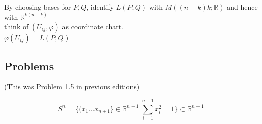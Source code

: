 By choosing bases for $P,Q$, identify $L(P;Q)$ with $M((n-k)k; \mathbb{R})$ and hence with $\mathbb{R}^{k(n-k)}$ \\

think of $(U_Q, \varphi)$ as coordinate chart. \\
$\varphi(U_Q) = L(P;Q)$













\subsection*{Problems}

 (This was Problem 1.5 in previous editions)

\[
S^n = \lbrace ( x_1 \dots x_{n+1} \rbrace \in \mathbb{R}^{n+1} | \sum_{i=1}^{n+1} x_i^2 = 1 \rbrace \subset \mathbb{R}^{n+1}
\]

